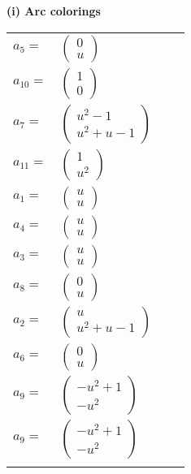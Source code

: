 \documentclass[1p]{elsarticle_modified}
\theoremstyle{definition}
\begin{document}
\flushleft \textbf{(i) Arc colorings}\\
\begin{tabular}{m{7pt} m{180pt} m{7pt} m{180pt} }
\flushright $a_{5}=$&$\begin{pmatrix}0\\u\end{pmatrix}$ \\
\flushright $a_{10}=$&$\begin{pmatrix}1\\0\end{pmatrix}$ \\
\flushright $a_{7}=$&$\begin{pmatrix}u^2-1\\u^2+u-1\end{pmatrix}$ \\
\flushright $a_{11}=$&$\begin{pmatrix}1\\u^2\end{pmatrix}$ \\
\flushright $a_{1}=$&$\begin{pmatrix}u\\u\end{pmatrix}$ \\
\flushright $a_{4}=$&$\begin{pmatrix}u\\u\end{pmatrix}$ \\
\flushright $a_{3}=$&$\begin{pmatrix}u\\u\end{pmatrix}$ \\
\flushright $a_{8}=$&$\begin{pmatrix}0\\u\end{pmatrix}$ \\
\flushright $a_{2}=$&$\begin{pmatrix}u\\u^2+u-1\end{pmatrix}$ \\
\flushright $a_{6}=$&$\begin{pmatrix}0\\u\end{pmatrix}$ \\
\flushright $a_{9}=$&$\begin{pmatrix}- u^2+1\\- u^2\end{pmatrix}$\\ \flushright $a_{9}=$&$\begin{pmatrix}- u^2+1\\- u^2\end{pmatrix}$\\&\end{tabular}
\end{document}
